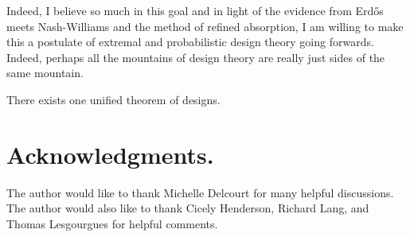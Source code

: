 \documentclass[twoside,leqno]{article}
\begin{document}
Indeed, I believe so much in this goal and in light of the evidence from Erd\H{o}s meets Nash-Williams and the method of refined absorption, I am willing to make this a postulate of extremal and probabilistic design theory going forwards. Indeed, perhaps all the mountains of design theory are really just sides of the same mountain.

\begin{postulate}[Postle]
There exists one unified theorem of designs.    
\end{postulate}


\section*{Acknowledgments.} The author would like to thank Michelle Delcourt for many helpful discussions. The author would also like to thank Cicely Henderson, Richard Lang, and Thomas Lesgourgues for helpful comments. 



\end{document}
